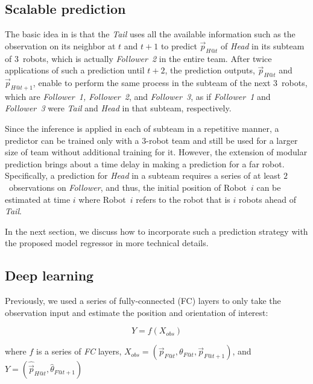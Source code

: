 \documentclass[letterpaper, 10 pt, conference]{ieeeconf}  %
\begin{document}
	\subsection{Scalable prediction} 
	\label{sec:scalable_prediction}
		
	The basic idea in \cite{CPR17} is that the \emph{Tail} uses all the available information 
	such as the observation on its neighbor
	at $t$ and $t+1$ to predict $\vec{p}_{H@t}$ of \emph{Head} in its subteam of $3$~robots, 
	which is actually \emph{Follower~2} in the entire team. 
	After twice applications of such a prediction until $t+2$, the prediction outputs, 
	$\vec{p}_{H@t}$ and $\vec{p}_{H@t+1}$, enable 
	to perform the same process in the subteam of the next $3$~robots, which are 
	\emph{Follower~1, Follower~2}, and \emph{Follower~3}, as if \emph{Follower~1} and 
	\emph{Follower~3} were \emph{Tail} and \emph{Head} in that subteam, respectively. 
	
	Since the inference is applied in each of subteam in a repetitive manner, 
	a predictor can be trained only with a $3$-robot team and still be used for a larger 
	size of team without additional training for it. However, the extension of 
	modular prediction brings about a time delay in making a prediction for a far robot. 	
	Specifically, a prediction for \emph{Head} in a subteam requires a series of at least 
	$2$~observations on \emph{Follower}, and thus, the initial position of Robot~$i$ can be estimated 
	at time $i$ where Robot~$i$ refers to the robot that is $i$ robots ahead of \emph{Tail}.
	
	In the next section, we discuss how to incorporate such a prediction strategy with 
	the proposed model regressor in more technical details. 
		
		
	\subsection{Deep learning}
	\label{sec:deep_learning}
	 
	Previously, we used a series of fully-connected (FC) layers to only take the
	observation input and estimate the position and orientation of interest: 
	
	\begin{equation}
	Y = f(X_{obs})
	\end{equation}
	
	\begin{flushleft}
	where $f$ is a series of \emph{FC} layers, 
	$X_{obs} = (\vec{p}_{F@t}, \theta_{F@t}, \vec{p}_{F@t+1})$, and
	$Y = (\hat{\vec{p}}_{H@t}, \hat{\theta}_{F@t+1})$
	\end{flushleft}
	
\end{document}
